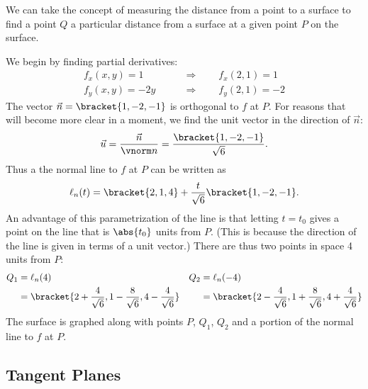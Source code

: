 We can take the concept of measuring the distance from a point to a surface to find a point $Q$ a particular distance from a surface at a given point $P$ on the surface.

{We begin by finding partial derivatives:
\begin{align*}
f_x(x,y)  =1  \qquad &\Rightarrow \qquad f_x(2,1) = 1\\
f_y(x,y) = -2y \qquad &\Rightarrow \qquad  f_y(2,1) = -2
\end{align*}
The vector $\vec n=\bracket{1,-2,-1}$ is orthogonal to $f$ at $P$. For reasons that will become more clear in a moment, we find the unit vector in the direction of $\vec n$:
\[\vec u = \frac{\vec n}{\vnorm n}=\frac{\bracket{1,-2,-1}}{\sqrt6} %
.\]
Thus a the normal line to $f$ at $P$ can be written as
\[\ell_n(t) =\bracket{2,1,4}+\frac t{\sqrt6}\bracket{1,-2,-1}%
.\]
An advantage of this parametrization of the line is that letting $t=t_0$ gives a point on the line that is $\abs{t_0}$ units from $P$. (This is because the direction of the line is given in terms of a unit vector.) There are thus two points in space 4 units from $P$:
%
%
%
\begin{align*}
Q_1 &= \ell_n(4) & Q_2 &= \ell_n(-4) \\
  &=\bracket{2+\frac4{\sqrt6},1-\frac8{\sqrt6},4-\frac4{\sqrt6}}
  & & =\bracket{2-\frac4{\sqrt6},1+\frac8{\sqrt6},4+\frac4{\sqrt6}}
\end{align*}
The surface is graphed along with points $P$, $Q_1$, $Q_2$ and a portion of the normal line to $f$ at $P$.}

\subsection*{Tangent Planes}

